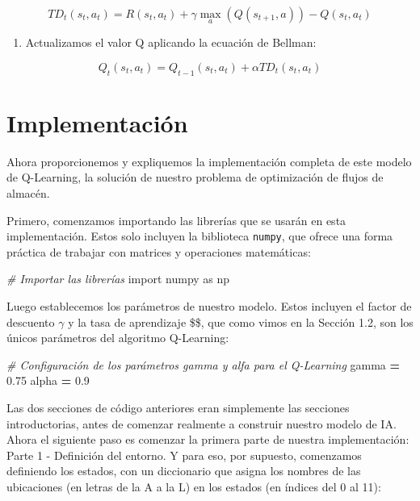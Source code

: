 \documentclass[]{book}
\newenvironment{Shaded}{\begin{snugshade}}{\end{snugshade}}
\newcommand{\CommentTok}[1]{\textcolor[rgb]{0.56,0.35,0.01}{\textit{#1}}}
\newcommand{\FloatTok}[1]{\textcolor[rgb]{0.00,0.00,0.81}{#1}}
\newcommand{\ImportTok}[1]{#1}
\newcommand{\NormalTok}[1]{#1}
\newcommand{\OperatorTok}[1]{\textcolor[rgb]{0.81,0.36,0.00}{\textbf{#1}}}
\providecommand{\tightlist}{%
  \setlength{\itemsep}{0pt}\setlength{\parskip}{0pt}}
\begin{document}
\[TD_t(s_t,a_t) = R(s_t,a_t) + \gamma \underset{a}{\max}(Q(s_{t+1},a)) - Q(s_t, a_t)\]

\begin{enumerate}
\def\labelenumi{\arabic{enumi}.}
\setcounter{enumi}{4}
\tightlist
\item
  Actualizamos el valor Q aplicando la ecuación de Bellman:
\end{enumerate}

\[Q_t(s_t,a_t) = Q_{t-1}(s_t,a_t) + \alpha TD_t(s_t,a_t)\]

\hypertarget{implementaciuxf3n}{%
\section{Implementación}\label{implementaciuxf3n}}

Ahora proporcionemos y expliquemos la implementación completa de este modelo de Q-Learning, la solución de nuestro problema de optimización de flujos de almacén.

Primero, comenzamos importando las librerías que se usarán en esta implementación. Estos solo incluyen la biblioteca \texttt{numpy}, que ofrece una forma práctica de trabajar con matrices y operaciones matemáticas:

\begin{Shaded}
\begin{Highlighting}[]
\CommentTok{# Importar las librerías}
\ImportTok{import}\NormalTok{ numpy }\ImportTok{as}\NormalTok{ np}
\end{Highlighting}
\end{Shaded}

Luego establecemos los parámetros de nuestro modelo. Estos incluyen el factor de descuento \(\gamma\) y la tasa de aprendizaje \$\alpha \$, que como vimos en la Sección 1.2, son los únicos parámetros del algoritmo Q-Learning:

\begin{Shaded}
\begin{Highlighting}[]
\CommentTok{# Configuración de los parámetros gamma y alfa para el Q-Learning}
\NormalTok{gamma }\OperatorTok{=} \FloatTok{0.75}
\NormalTok{alpha }\OperatorTok{=} \FloatTok{0.9}
\end{Highlighting}
\end{Shaded}

Las dos secciones de código anteriores eran simplemente las secciones introductorias, antes de comenzar realmente a construir nuestro modelo de IA. Ahora el siguiente paso es comenzar la primera parte de nuestra implementación: Parte 1 - Definición del entorno. Y para eso, por supuesto, comenzamos definiendo los estados, con un diccionario que asigna los nombres de las ubicaciones (en letras de la A a la L) en los estados (en índices del 0 al 11):
\end{document}
